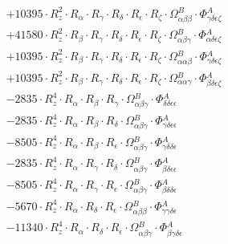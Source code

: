 \documentclass{article}
\begin{document}
\begin{subequations}
\begin{gather}
\begin{array}{c}
 \\[0.2em] 		 + 10395 \cdot R_{z}^{2} \cdot R_{\alpha{}} \cdot R_{\gamma{}} \cdot R_{\delta{}} \cdot R_{\epsilon{}} \cdot R_{\zeta{}} \cdot \Omega{}^{B}_{\alpha{}\beta{}\beta{}} \cdot \Phi{}^{A}_{\gamma{}\delta{}\epsilon{}\zeta{}} 
 \\[0.2em] 		 + 41580 \cdot R_{z}^{2} \cdot R_{\beta{}} \cdot R_{\gamma{}} \cdot R_{\delta{}} \cdot R_{\epsilon{}} \cdot R_{\zeta{}} \cdot \Omega{}^{B}_{\alpha{}\beta{}\gamma{}} \cdot \Phi{}^{A}_{\alpha{}\delta{}\epsilon{}\zeta{}} 
 \\[0.2em] 		 + 10395 \cdot R_{z}^{2} \cdot R_{\beta{}} \cdot R_{\gamma{}} \cdot R_{\delta{}} \cdot R_{\epsilon{}} \cdot R_{\zeta{}} \cdot \Omega{}^{B}_{\alpha{}\alpha{}\beta{}} \cdot \Phi{}^{A}_{\gamma{}\delta{}\epsilon{}\zeta{}} 
 \\[0.2em] 		 + 10395 \cdot R_{z}^{2} \cdot R_{\beta{}} \cdot R_{\gamma{}} \cdot R_{\delta{}} \cdot R_{\epsilon{}} \cdot R_{\zeta{}} \cdot \Omega{}^{B}_{\alpha{}\alpha{}\gamma{}} \cdot \Phi{}^{A}_{\beta{}\delta{}\epsilon{}\zeta{}} 
 \\[0.2em] 		 - 2835 \cdot R_{z}^{4} \cdot R_{\alpha{}} \cdot R_{\beta{}} \cdot R_{\gamma{}} \cdot \Omega{}^{B}_{\alpha{}\beta{}\gamma{}} \cdot \Phi{}^{A}_{\delta{}\delta{}\epsilon{}\epsilon{}} 
 \\[0.2em] 		 - 2835 \cdot R_{z}^{4} \cdot R_{\alpha{}} \cdot R_{\beta{}} \cdot R_{\delta{}} \cdot \Omega{}^{B}_{\alpha{}\beta{}\gamma{}} \cdot \Phi{}^{A}_{\gamma{}\delta{}\epsilon{}\epsilon{}} 
 \\[0.2em] 		 - 8505 \cdot R_{z}^{4} \cdot R_{\alpha{}} \cdot R_{\beta{}} \cdot R_{\epsilon{}} \cdot \Omega{}^{B}_{\alpha{}\beta{}\gamma{}} \cdot \Phi{}^{A}_{\gamma{}\delta{}\delta{}\epsilon{}} 
 \\[0.2em] 		 - 2835 \cdot R_{z}^{4} \cdot R_{\alpha{}} \cdot R_{\gamma{}} \cdot R_{\delta{}} \cdot \Omega{}^{B}_{\alpha{}\beta{}\gamma{}} \cdot \Phi{}^{A}_{\beta{}\delta{}\epsilon{}\epsilon{}} 
 \\[0.2em] 		 - 8505 \cdot R_{z}^{4} \cdot R_{\alpha{}} \cdot R_{\gamma{}} \cdot R_{\epsilon{}} \cdot \Omega{}^{B}_{\alpha{}\beta{}\gamma{}} \cdot \Phi{}^{A}_{\beta{}\delta{}\delta{}\epsilon{}} 
 \\[0.2em] 		 - 5670 \cdot R_{z}^{4} \cdot R_{\alpha{}} \cdot R_{\delta{}} \cdot R_{\epsilon{}} \cdot \Omega{}^{B}_{\alpha{}\beta{}\beta{}} \cdot \Phi{}^{A}_{\gamma{}\gamma{}\delta{}\epsilon{}} 
 \\[0.2em] 		 - 11340 \cdot R_{z}^{4} \cdot R_{\alpha{}} \cdot R_{\delta{}} \cdot R_{\epsilon{}} \cdot \Omega{}^{B}_{\alpha{}\beta{}\gamma{}} \cdot \Phi{}^{A}_{\beta{}\gamma{}\delta{}\epsilon{}} 

\end{array}
\end{gather}
\end{subequations}
\end{document}
